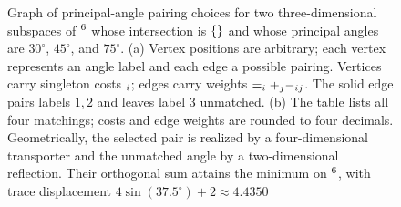 \begin{figure}[tb]
\centering
\resizebox{119mm}{!}{}
\caption{
Graph of principal-angle pairing choices for two three-dimensional subspaces
of $\sym{RealField}^6$ whose intersection is $\{\sym{ZeroVector}\}$ and whose principal angles are
$30^\circ$, $45^\circ$, and $75^\circ$.
(a) Vertex positions are arbitrary; each vertex represents an angle label and
each edge a possible pairing. Vertices carry singleton costs $\like{SingletonCost}{\symglyph{SingletonCost}_i}$;
edges carry weights $\sym{MatchingEdgeWeight}=\like{SingletonCost}{\symglyph{SingletonCost}_i}+\like{SingletonCost}{\symglyph{SingletonCost}_j}-\like{PairCost}{\symglyph{PairCost}_{ij}}$. The solid edge
pairs labels $1,2$ and leaves label $3$ unmatched. (b) The table lists all four
matchings; costs and edge weights are rounded to four decimals. Geometrically,
the selected pair is realized by a four-dimensional transporter and the
unmatched angle by a two-dimensional reflection. Their orthogonal sum
attains the minimum on $\sym{RealField}^6$, with trace displacement
$4\sin(37.5^\circ)+2\approx4.4350$}
\label{fig:real-nuclear-matching}
\end{figure}


